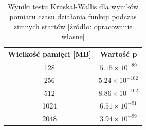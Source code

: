 \begin{figure}[p]
\begin{minipage}[t]{0.48\textwidth}
        \label{fig:cold_start_256}
    \end{minipage}
\end{figure}

\begin{table}[H]
    \centering
    \caption{Wyniki testu Kruskal-Wallis dla wyników pomiaru czasu działania funkcji podczas zimnych startów [źródło: opracowanie własne]}
    \begin{tabular}{|c|c|}
    \hline
    \textbf{Wielkość pamięci [MB]} & \textbf{Wartość p} \\
    \hline
    128 & $5.15 \times 10^{-89}$ \\
    \hline
    256 & $5.24 \times 10^{-102}$ \\
    \hline
    512 & $8.86 \times 10^{-102}$ \\
    \hline
    1024 & $6.51 \times 10^{-91}$ \\
    \hline
    2048 & $3.94 \times 10^{-99}$ \\
    \hline
    \end{tabular}
    \label{table:kruskal_wallis_test_cold_starts}
\end{table}

